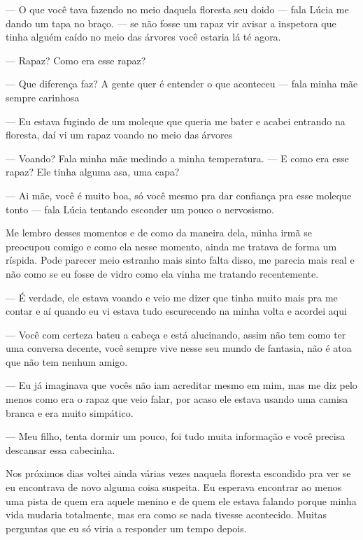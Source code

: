 — O que você tava fazendo no meio daquela floresta seu doido — fala Lúcia me dando um tapa no braço. — se não fosse um rapaz vir avisar a inspetora que tinha alguém caído no meio das árvores você estaria lá té agora.

— Rapaz? Como era esse rapaz?

— Que diferença faz? A gente quer é entender o que aconteceu — fala minha mãe sempre carinhosa

— Eu estava fugindo de um moleque que queria me bater e acabei entrando na floresta, daí vi um rapaz voando no meio das árvores

— Voando? Fala minha mãe medindo a minha temperatura. — E como era esse rapaz? Ele tinha alguma asa, uma capa?

— Ai mãe, você é muito boa, só você mesmo pra dar confiança pra esse moleque tonto — fala Lúcia tentando esconder um pouco o nervosismo.

Me lembro desses momentos e de como da maneira dela, minha irmã se preocupou comigo e como ela nesse momento, ainda me tratava de forma um ríspida. Pode parecer meio estranho mais sinto falta disso, me parecia mais real e não como se eu fosse de vidro como ela vinha me tratando recentemente.

— É verdade, ele estava voando e veio me dizer que tinha muito mais pra me contar e aí quando eu vi estava tudo escurecendo na minha volta e acordei aqui

— Você com certeza bateu a cabeça e está alucinando, assim não tem como ter uma conversa decente, você sempre vive nesse seu mundo de fantasia, não é atoa que não tem nenhum amigo.

— Eu já imaginava que vocês não iam acreditar mesmo em mim, mas me diz pelo menos como era o rapaz que veio falar, por acaso ele estava usando uma camisa branca e era muito simpático.

— Meu filho, tenta dormir um pouco, foi tudo muita informação e você precisa descansar essa cabecinha.

Nos próximos dias voltei ainda várias vezes naquela floresta escondido pra ver se eu encontrava de novo alguma coisa suspeita. Eu esperava encontrar ao menos uma pista de quem era aquele menino e de quem ele estava falando porque minha vida mudaria totalmente, mas era como se nada tivesse acontecido. Muitas perguntas que eu só viria a responder um tempo depois.


